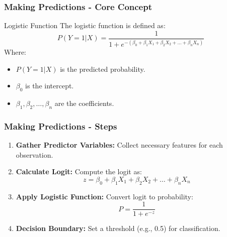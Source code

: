 \documentclass[aspectratio=169]{beamer}
\begin{document}
\begin{frame}[fragile]
  \frametitle{Making Predictions - Core Concept}
  
  \begin{block}{Logistic Function}
    The logistic function is defined as:
    \begin{equation}
      P(Y=1 | X) = \frac{1}{1 + e^{-(\beta_0 + \beta_1X_1 + \beta_2X_2 + \ldots + \beta_nX_n)}}
    \end{equation}
    Where:
    \begin{itemize}
      \item \(P(Y=1 | X)\) is the predicted probability.
      \item \(\beta_0\) is the intercept.
      \item \(\beta_1, \beta_2, \ldots, \beta_n\) are the coefficients.
    \end{itemize}
  \end{block}
  
\end{frame}

\begin{frame}[fragile]
  \frametitle{Making Predictions - Steps}
  
  \begin{enumerate}
    \item \textbf{Gather Predictor Variables:} Collect necessary features for each observation.
    \item \textbf{Calculate Logit:} Compute the logit as:
      \begin{equation}
        z = \beta_0 + \beta_1X_1 + \beta_2X_2 + \ldots + \beta_nX_n
      \end{equation}
    \item \textbf{Apply Logistic Function:} Convert logit to probability:
      \begin{equation}
        P = \frac{1}{1 + e^{-z}}
      \end{equation}
    \item \textbf{Decision Boundary:} Set a threshold (e.g., 0.5) for classification.
  \end{enumerate}

\end{frame}
\end{document}
